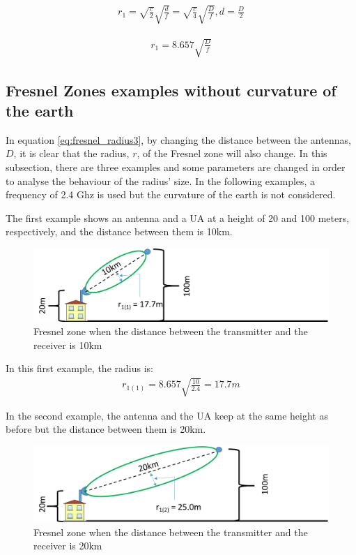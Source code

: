 \begin{align}
r_1 = \sqrt{\frac{c}{2}}\sqrt{\frac{d}{f}} = \sqrt{\frac{c}{4}}\sqrt{\frac{D}{f}}, d=\frac{D}{2} \label{eq:fresnel_radius2}
\end{align}

\begin{align}
r_1 = 8.657 \sqrt{\frac{D}{f}} \label{eq:fresnel_radius3}
\end{align}

\subsection{Fresnel Zones examples without curvature of the earth}
In equation \ref{eq:fresnel_radius3}, by changing the distance between the antennas, $D$, it is clear that the radius, $r$, of the Fresnel zone will also change. In this subsection, there are three examples and some parameters are changed in order to analyse the behaviour of the radius' size. In the following examples, a frequency of 2.4 Ghz is used but the curvature of the earth is not considered. 

The first example shows an antenna and a UA at a height of 20 and 100 meters, respectively, and the distance between them is 10km.

\begin{figure}[H]
	\centering
	\includegraphics[scale=0.50]{figures/fresnel_10km.png}
	\caption{Fresnel zone when the distance between the transmitter and the receiver is 10km}
	\label{fig:fresnel_zones_10km}
\end{figure}  

In this first example, the radius is:
\begin{align*}
r_{1(1)} = 8.657 \sqrt{\frac{10}{2.4}} = 17.7m
\end{align*}

In the second example, the antenna and the UA keep at the same height as before but the distance between them is 20km.

\begin{figure}[H]
	\centering
	\includegraphics[scale=0.50]{figures/fresnel_20km.png}
	\caption{Fresnel zone when the distance between the transmitter and the receiver is 20km}
	\label{fig:fresnel_zones_20km}
\end{figure}  

